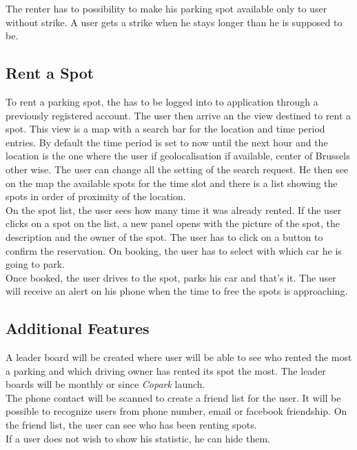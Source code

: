 \documentclass[12pt,a4paper,oneside]{book}
\newcommand{\bp}{\textit{Copark }}
\begin{document}
The renter has to possibility to make his parking spot available only to user without strike. A user gets a strike when he stays longer than he is supposed to be.

\subsection{Rent a Spot}
To rent a parking spot, the has to be logged into to application through a previously registered account. The user then arrive an the view destined to rent a spot. This view is a map with a search bar for the location and time period entries. By default the time period is set to now until the next hour and the location is the one where the user if geolocalisation if available, center of Brussels other wise. The user can change all the setting of the search request. He then see on the map the available spots for the time slot and there is a list showing the spots in order of proximity of the location.\\

On the spot list, the user sees how many time it was already rented. If the user clicks on a spot on the list, a new panel opens with the picture of the spot, the description and the owner of the spot. The user has to click on a button to confirm the reservation. On booking, the user has to select with which car he is going to park.\\

Once booked, the user drives to the spot, parks his car and that's it. The user will receive an alert on his phone when the time to free the spots is approaching.

\subsection{Additional Features}
A leader board will be created where user will be able to see who rented the most a parking and which driving owner has rented its spot the most. The leader boards will be monthly or since \bp launch.\\
The phone contact will be scanned to create a friend list for the user. It will be possible to recognize users from phone number, email or facebook friendship. On the friend list, the user can see who has been renting spots.\\
If a user does not wish to show his statistic, he can hide them.\\
\end{document}
